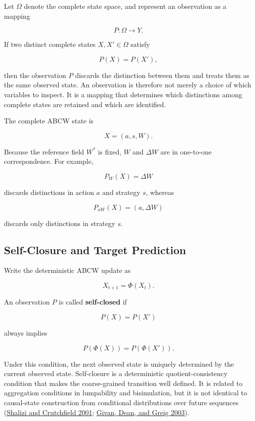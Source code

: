 \documentclass[
  11pt,
]{article}
\begin{document}
Let \({\Omega}\) denote the complete state space, and represent an
observation as a mapping

\[{P:\Omega\longrightarrow Y.}\]

If two distinct complete states \({X,X'\in\Omega}\) satisfy

\[{P(X)=P(X'),}\]

then the observation \({P}\) discards the distinction between them and
treats them as the same observed state. An observation is therefore not
merely a choice of which variables to inspect. It is a mapping that
determines which distinctions among complete states are retained and
which are identified.

The complete ABCW state is

\[{X=(a,s,W).}\]

Because the reference field \({W^\ast}\) is fixed, \({W}\) and
\({\Delta W}\) are in one-to-one correspondence. For example,

\[{P_W(X)=\Delta W}\]

discards distinctions in action \({a}\) and strategy \({s}\), whereas

\[{P_{aW}(X)=(a,\Delta W)}\]

discards only distinctions in strategy \({s}\).

\hypertarget{self-closure-and-target-prediction}{%
\subsection{Self-Closure and Target
Prediction}\label{self-closure-and-target-prediction}}

Write the deterministic ABCW update as

\[{X_{t+1}=\Phi(X_t).}\]

An observation \({P}\) is called \textbf{self-closed} if

\[{P(X)=P(X')}\]

always implies

\[{P(\Phi(X))=P(\Phi(X')).}\]

Under this condition, the next observed state is uniquely determined by
the current observed state. Self-closure is a deterministic
quotient-consistency condition that makes the coarse-grained transition
well defined. It is related to aggregation conditions in lumpability and
bisimulation, but it is not identical to causal-state construction from
conditional distributions over future sequences
(\protect\hyperlink{ref-shalizi2001}{Shalizi and Crutchfield 2001};
\protect\hyperlink{ref-givan2003}{Givan, Dean, and Greig 2003}).
\end{document}
